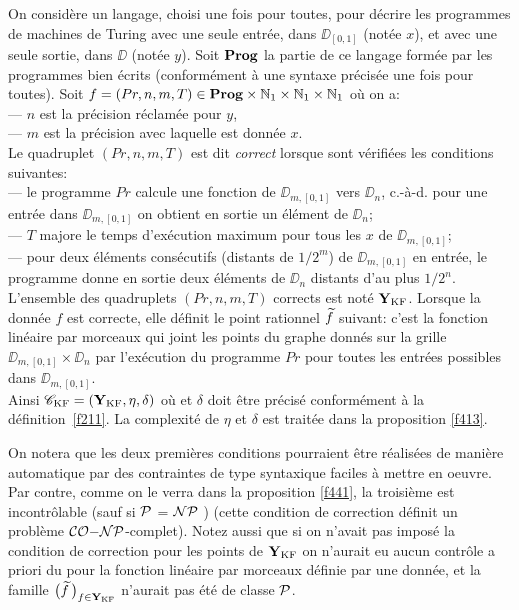 \begin{fdefinition}\label{f411}
On considère un langage, choisi une fois pour toutes, pour décrire les 
programmes de machines de Turing avec une seule entrée, dans $\DD_{[0,1]}$  
(notée  $x$), et avec une seule sortie, dans $\DD$  (notée  $y$). Soit  
${\bf Prog}$  la partie de ce langage formée par les programmes bien écrits (conformément à une syntaxe précisée une fois pour toutes).
Soit  $f = (Pr, n, m, T) \in {\bf Prog} \times \mathbb {N}_1 \times \mathbb {N}_1 
\times \mathbb {N}_1$  où  on a:\\
--- $n$  est la précision réclamée pour  $y$,\\
--- $m$  est la précision avec laquelle est donnée  $x$.\\
Le quadruplet  $(Pr,n,m,T)$  est dit {\em correct} lorsque sont vérifiées 
les conditions suivantes:\\
--- le programme  $Pr$  calcule une fonction de $\DD_{m,[0,1]}$  vers  
$\DD_n$,  c.-à-d. pour une entrée dans  $\DD_{m,[0,1]}$   on obtient en 
sortie un élément de  $\DD_n$;\\
--- $T$  majore le temps d'exécution maximum pour tous les $x$ de  
$\DD_{m,[0,1]}$; \\
--- pour deux éléments consécutifs (distants de  $1/2^m$) de  
$\DD_{m,[0,1]}$  en entrée, le programme donne en sortie deux éléments de  
$\DD_n$  distants d'au plus  $1/2^n$.\\
L'ensemble des quadruplets  $(Pr,n,m,T)$  corrects est noté  ${{\bf Y}_{\rm KF}}$\label{fykf}.
  Lorsque la donnée $f$ est correcte, elle définit le point rationnel  
$\widetilde{f}$  suivant:  c'est la fonction linéaire par morceaux qui
 joint les points du graphe donnés sur la grille  
$\DD_{m,[0,1]} \times  \DD_n$  par l'exécution du programme $Pr$  pour 
toutes les entrées 
possibles dans  $\DD_{m,[0,1]}$.\\
Ainsi ${{{\mathscr C}}_{\rm KF}}=({{\bf Y}_{\rm KF}},\eta,\delta)$ où   et $\delta$ doit être précisé conformément à la définition~\ref{f211}. La complexité de $\eta$ et $\delta$ est traitée dans la proposition \ref{f413}. 
\end{fdefinition} 

\begin{fremark}\label{f412}
 On notera que les deux premières conditions pourraient être réalisées 
de manière automatique par des contraintes de type syntaxique faciles à 
mettre en oeuvre. Par contre, comme on le verra dans la proposition \ref{f441}, 
la troisième est incontrôlable \etpo (sauf si  ${\cal P}$ = ${\cal NP}$ ) (cette 
condition de correction définit un problème ${\cal CO}{\rm-}{\cal NP}$-complet). 
Notez aussi que si on n'avait pas imposé la condition de correction pour les points de  ${{\bf Y}_{\rm KF}}$  
on n'aurait eu aucun contrôle a priori du \mcu pour la fonction linéaire par 
morceaux définie par une donnée, et la famille  $\big(\widetilde{f}\,\big)_{f \in {{\bf Y}_{\rm KF}} 
}$  n'aurait pas été \uni de classe  ${\cal P}$.
\end{fremark}

